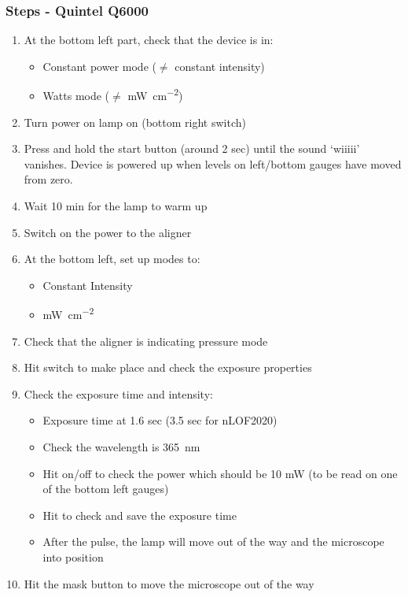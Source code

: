 \subsubsection{Steps - Quintel Q6000}
\begin{enumerate}
\item At the bottom left part, check that the device is in:
\begin{itemize}[nolistsep, noitemsep]
\item Constant power mode ($\neq$ constant intensity)
\item Watts mode ($\neq$ \si{\milli\watt\per\square\centi\meter})
\end{itemize}
\item Turn power on lamp on (bottom right switch)
\item Press and hold the start button (around 2 sec) until the sound `wiiiii' vanishes.
Device is powered up when levels on left/bottom gauges have moved from zero.
\item Wait 10 min for the lamp to warm up
\item Switch on the power to the aligner
\item At the bottom left, set up modes to:
\begin{itemize}[nolistsep, noitemsep]
  \item Constant Intensity
  \item \si{\milli\watt\per\square\centi\meter}
\end{itemize}
\item Check that the aligner is indicating pressure mode
\item Hit  switch to make place and check the exposure properties
\item Check the exposure time and intensity:
\begin{itemize}[nolistsep, noitemsep]
  \item Exposure time at 1.6 sec (3.5 sec for nLOF2020)
  \item Check the wavelength is \SI{365}{\nano\meter}
  \item Hit  on/off to check the power which should be 10 mW (to be read on one of the bottom left gauges)
  \item Hit  to check and save the exposure time
  \item After the pulse, the lamp will move out of the way and the microscope into position
\end{itemize}
\item Hit the mask  button to move the microscope out of the way

\end{enumerate}
